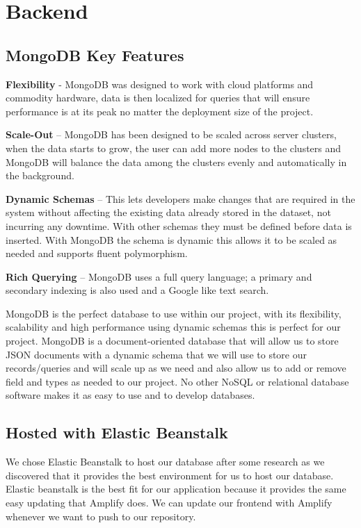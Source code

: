 \section{Backend}


\subsection{MongoDB Key Features}

\textbf{Flexibility} - MongoDB\cite{ref17} was designed to work with cloud platforms and commodity hardware, data is then localized for queries that will ensure performance is at its peak no matter the deployment size of the project. \hfill \break

\textbf{Scale-Out} – MongoDB has been designed to be scaled across server clusters, when the data starts to grow, the user can add more nodes to the clusters and MongoDB will balance the data among the clusters evenly and automatically in the background. \hfill \break

\textbf{Dynamic Schemas} – This lets developers make changes that are required in the system without affecting the existing data already stored in the dataset, not incurring any downtime. With other schemas they must be defined before data is inserted. With MongoDB the schema is dynamic this allows it to be scaled as needed and supports fluent polymorphism.    \hfill \break

\textbf{Rich Querying} – MongoDB uses a full query language; a primary and secondary indexing is also used and a Google like text search.  \hfill \break

MongoDB is the perfect database to use within our project, with its flexibility, scalability and high performance using dynamic schemas this is perfect for our project. MongoDB is a document-oriented database that will allow us to store JSON documents with a dynamic schema that we will use to store our records/queries and will scale up as we need and also allow us to add or remove field and types as needed to our project. No other NoSQL or relational database software makes it as easy to use and to develop databases. 



\subsection{Hosted with Elastic Beanstalk}

We chose Elastic Beanstalk \cite{ref18} to host our database after some research as we discovered that it provides the best environment for us to host our database. Elastic beanstalk is the best fit for our application because it provides the same easy updating that Amplify\cite{ref22} does. We can update our frontend with Amplify whenever we want to push to our repository.
\hfill \break


